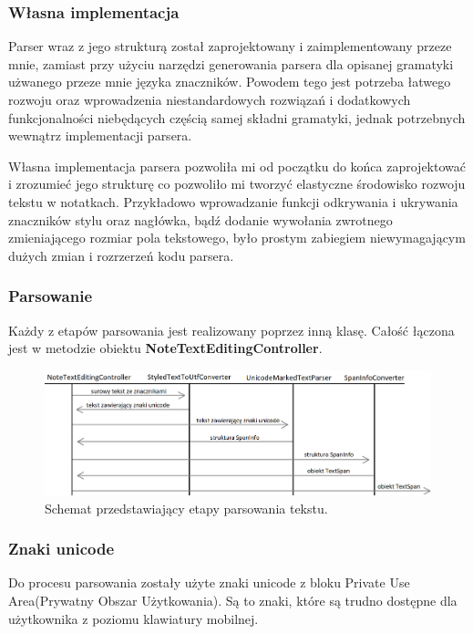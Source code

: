 \subsubsection{Własna implementacja}

Parser wraz z jego strukturą został zaprojektowany i zaimplementowany przeze mnie, zamiast przy użyciu narzędzi generowania parsera dla opisanej gramatyki użwanego przeze mnie języka znaczników. Powodem tego jest potrzeba łatwego rozwoju oraz wprowadzenia niestandardowych rozwiązań i dodatkowych funkcjonalności niebędących częścią samej składni gramatyki, jednak potrzebnych wewnątrz implementacji parsera.

Własna implementacja parsera pozwoliła mi od początku do końca zaprojektować i zrozumieć jego strukturę co pozwoliło mi tworzyć elastyczne środowisko rozwoju tekstu w notatkach. Przykładowo wprowadzanie funkcji odkrywania i ukrywania znaczników stylu oraz nagłówka, bądź dodanie wywołania zwrotnego zmieniającego rozmiar pola tekstowego, było prostym zabiegiem niewymagającym dużych zmian i rozrzerzeń kodu parsera.

\subsubsection{Parsowanie}

Każdy z etapów parsowania jest realizowany poprzez inną klasę. Całość łączona jest w metodzie obiektu \textbf{NoteTextEditingController}.
\newline
\begin{figure}[ht]
    \centering
    \includegraphics[width=\linewidth]{images/etapy_parsowania.png}
    \caption{Schemat przedstawiający etapy parsowania tekstu.}
    \label{fig:etapyParsowania}
\end{figure}

\subsubsection{Znaki unicode}

Do procesu parsowania zostały użyte znaki unicode z bloku Private Use Area(Prywatny Obszar Użytkowania). Są to znaki, które są trudno dostępne dla użytkownika z poziomu klawiatury mobilnej.

